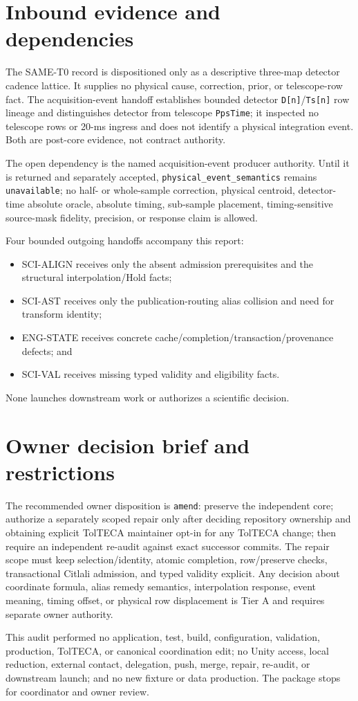 \documentclass[11pt]{article}
\newcommand{\code}[1]{\texttt{#1}}
\begin{document}
\section{Inbound evidence and dependencies}

The SAME-T0 record is dispositioned only as a descriptive three-map detector
cadence lattice.  It supplies no physical cause, correction, prior, or
telescope-row fact.  The acquisition-event handoff establishes bounded
detector \code{D[n]}/\code{Ts[n]} row lineage and distinguishes detector from
telescope \code{PpsTime}; it inspected no telescope rows or 20-ms ingress and
does not identify a physical integration event.  Both are post-core evidence,
not contract authority.

The open dependency is the named acquisition-event producer authority.  Until
it is returned and separately accepted, \code{physical\_event\_semantics}
remains \code{unavailable}; no half- or whole-sample correction, physical
centroid, detector-time absolute oracle, absolute timing, sub-sample placement,
timing-sensitive source-mask fidelity, precision, or response claim is allowed.

Four bounded outgoing handoffs accompany this report:

\begin{itemize}
\item SCI-ALIGN receives only the absent admission prerequisites and the
  structural interpolation/Hold facts;
\item SCI-AST receives only the publication-routing alias collision and need
  for transform identity;
\item ENG-STATE receives concrete cache/completion/transaction/provenance
  defects; and
\item SCI-VAL receives missing typed validity and eligibility facts.
\end{itemize}

None launches downstream work or authorizes a scientific decision.

\section{Owner decision brief and restrictions}

The recommended owner disposition is \code{amend}: preserve the independent
core; authorize a separately scoped repair only after deciding repository
ownership and obtaining explicit TolTECA maintainer opt-in for any TolTECA
change; then require an independent re-audit against exact successor commits.
The repair scope must keep selection/identity, atomic completion, row/preserve
checks, transactional Citlali admission, and typed validity explicit.  Any
decision about coordinate formula, alias remedy semantics, interpolation
response, event meaning, timing offset, or physical row displacement is Tier A
and requires separate owner authority.

This audit performed no application, test, build, configuration, validation,
production, TolTECA, or canonical coordination edit; no Unity access, local
reduction, external contact, delegation, push, merge, repair, re-audit, or
downstream launch; and no new fixture or data production.  The package stops
for coordinator and owner review.
\end{document}
